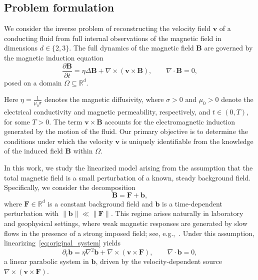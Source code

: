 \documentclass[12pt]{article}
\begin{document}
    \subsection{Problem formulation}
  
	We consider the inverse problem of reconstructing the velocity field $\boldsymbol{v}$ of a conducting fluid from full internal observations of the magnetic field in dimensions \( d \in\{ 2, 3\} \). 
	The full dynamics of the magnetic field \( \boldsymbol{B} \) are governed by the magnetic induction equation
	\begin{equation}
		{{} \frac{\partial \boldsymbol{B}}{\partial t} 
		= \eta  \Delta\boldsymbol{B} + \nabla\times\left(\boldsymbol{v} \times \boldsymbol{B} \right), 
		\qquad \nabla \cdot\boldsymbol{B} = 0,}
		\label{eq:original_system}
	\end{equation}
	posed on a domain $\Omega\subseteq \mathbb{R}^d$.
    
    Here $\eta=\frac{1}{\mu_0 \sigma}$ denotes the magnetic diffusivity, where \( \sigma > 0 \) and \( \mu_0 > 0 \) denote the electrical conductivity and magnetic permeability, respectively, 
	and $t\in (0,T)$, for some $T>0$. 
	The term \( \boldsymbol{v} \times \boldsymbol{B} \) accounts for the electromagnetic induction generated by the motion of the fluid. Our primary objective is to determine the conditions under which the velocity $\boldsymbol{v}$ is uniquely identifiable from the knowledge of the induced field $\boldsymbol{B}$ within $\Omega$.

 

		
		
		
		
		
		
		In this work, we study the linearized model arising from the assumption that the total magnetic field is a small perturbation of a known, steady background field. Specifically, we consider the decomposition
		\[
		\boldsymbol{B} = \mathbf{F} + \boldsymbol{b},
		\]
		where \( \mathbf{F}\in\mathbb{R}^d \) is a constant background field and \( \boldsymbol{b} \) is a time-dependent perturbation with \( \| \boldsymbol{b} \| \ll \| \mathbf{F} \| \). This regime arises naturally in laboratory and geophysical settings, where weak magnetic responses are generated by slow flows in the presence of a strong imposed field; see, e.g.,~\cite{ruderman2010stability,weaver1965magnetic,stefani1999velocity}. 
		Under this assumption, linearizing~\eqref{eq:original_system} yields
		\begin{equation}
			{{}\partial_{t}\boldsymbol{b} = \eta \nabla^2\boldsymbol{b} + \nabla \times (\boldsymbol{v}\times \mathbf{F} ), \qquad \nabla \cdot \boldsymbol{b} = 0,}
			\label{eq:linearized_induction}
		\end{equation}
		a linear parabolic system in \( \boldsymbol{b} \), driven by the velocity-dependent source {{} \( \nabla \times (\boldsymbol{v}\times \mathbf{F}  )\)}.
		
\end{document}
